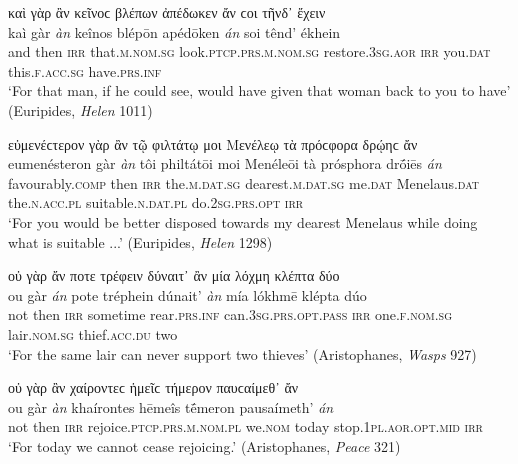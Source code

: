 \begin{exe}
\ex καὶ γὰρ ἂν κεῖνοϲ βλέπων ἀπέδωκεν ἄν ϲοι τῆνδ᾽ ἔχειν\\
\gll kaì gàr \emph{àn} keînos blépōn apédōken \emph{án} soi tênd' ékhein\\
and then \textsc{irr} that.\textsc{m.nom.sg} look.\textsc{ptcp.prs.m.nom.sg} restore.\textsc{3sg.aor} \textsc{irr} you.\textsc{dat} this.\textsc{f.acc.sg} have.\textsc{prs.inf}\\
\trans `For that man, if he could see, would have given that woman back to you to have' (Euripides, \textit{Helen} 1011)
\label{garan7}
\end{exe}

\begin{exe}
\ex εὐμενέϲτερον γὰρ ἂν τῷ φιλτάτῳ μοι Μενέλεῳ τὰ πρόϲφορα δρῴηϲ ἄν\\
\gll eumenésteron gàr \emph{àn} tôi philtátōi moi Menéleōi tà prósphora drṓiēs \emph{án}\\
favourably.\textsc{comp} then \textsc{irr} the.\textsc{m.dat.sg} dearest.\textsc{m.dat.sg} me.\textsc{dat} Menelaus.\textsc{dat} the.\textsc{n.acc.pl} suitable.\textsc{n.dat.pl} do.\textsc{2sg.prs.opt} \textsc{irr}\\
\trans `For you would be better disposed towards my dearest Menelaus while doing what is suitable ...' (Euripides, \textit{Helen} 1298)
\label{garan8}
\end{exe}

\begin{exe}
\ex οὐ γὰρ ἄν ποτε τρέφειν δύναιτ᾽ ἂν μία λόχμη κλέπτα δύο\\
\gll ou gàr \emph{án} pote tréphein dúnait' \emph{àn} mía lókhmē klépta dúo\\
not then \textsc{irr} sometime rear.\textsc{prs.inf} can.\textsc{3sg.prs.opt.pass} \textsc{irr} one.\textsc{f.nom.sg} lair.\textsc{nom.sg} thief.\textsc{acc.du} two\\
\trans `For the same lair can never support two thieves' (Aristophanes, \textit{Wasps} 927)
\label{garan9}
\end{exe}

\begin{exe}
\ex οὐ γὰρ ἂν χαίροντεϲ ἡμεῖϲ τήμερον παυϲαίμεθ᾽ ἄν\\
\gll ou gàr \emph{àn} khaírontes hēmeîs tḗmeron pausaímeth' \emph{án}\\
not then \textsc{irr} rejoice.\textsc{ptcp.prs.m.nom.pl} we.\textsc{nom} today stop.\textsc{1pl.aor.opt.mid} \textsc{irr}\\
\trans `For today we cannot cease rejoicing.' (Aristophanes, \textit{Peace} 321)
\label{garan10}
\end{exe}

